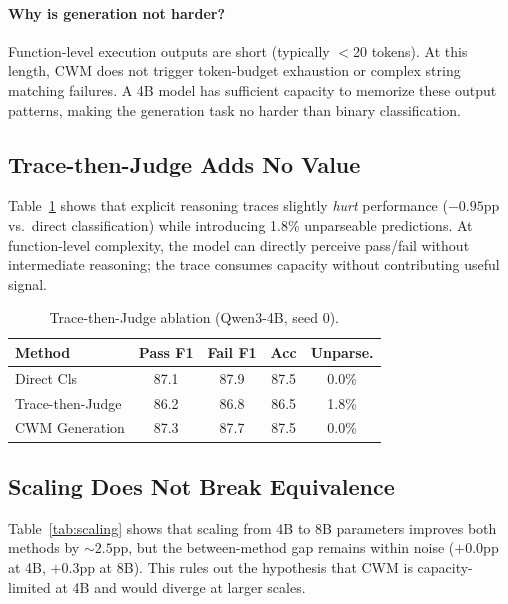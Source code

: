 \documentclass[11pt,a4paper]{article}
\begin{document}
\paragraph{Why is generation not harder?}
Function-level execution outputs are short (typically $<$20 tokens).
At this length, CWM does not trigger token-budget exhaustion or complex string matching failures.
A 4B model has sufficient capacity to memorize these output patterns, making the generation task no harder than binary classification.

\subsection{Trace-then-Judge Adds No Value}

Table~\ref{tab:ttj} shows that explicit reasoning traces slightly \emph{hurt} performance ($-0.95$pp vs.\ direct classification) while introducing 1.8\% unparseable predictions.
At function-level complexity, the model can directly perceive pass/fail without intermediate reasoning; the trace consumes capacity without contributing useful signal.

\begin{table}[t]
\centering
\small
\caption{Trace-then-Judge ablation (Qwen3-4B, seed 0).}
\label{tab:ttj}
\begin{tabular}{lcccc}
\toprule
\textbf{Method} & \textbf{Pass F1} & \textbf{Fail F1} & \textbf{Acc} & \textbf{Unparse.} \\
\midrule
Direct Cls & 87.1 & 87.9 & 87.5 & 0.0\% \\
Trace-then-Judge & 86.2 & 86.8 & 86.5 & 1.8\% \\
CWM Generation & 87.3 & 87.7 & 87.5 & 0.0\% \\
\bottomrule
\end{tabular}
\end{table}

\subsection{Scaling Does Not Break Equivalence}

Table~\ref{tab:scaling} shows that scaling from 4B to 8B parameters improves both methods by ${\sim}2.5$pp, but the between-method gap remains within noise ($+0.0$pp at 4B, $+0.3$pp at 8B).
This rules out the hypothesis that CWM is capacity-limited at 4B and would diverge at larger scales.
\end{document}
